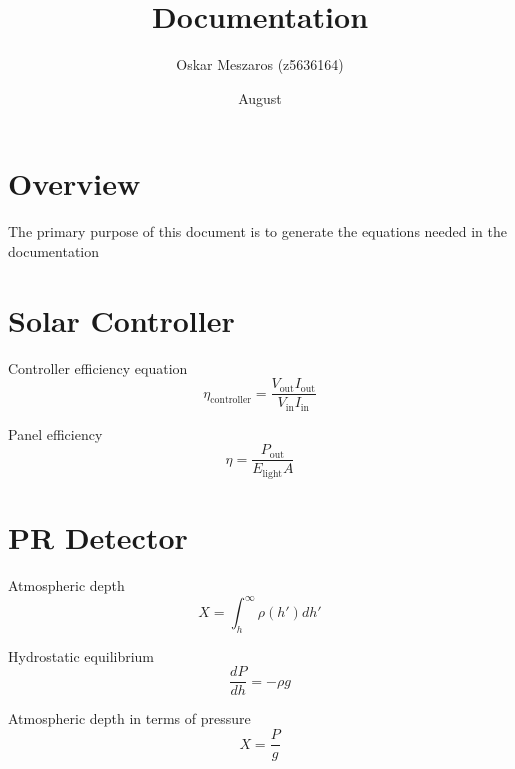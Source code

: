 \documentclass{article}
\title{Documentation}
\author{Oskar Meszaros (z5636164)}
\date{August}
\begin{document}
\maketitle
\section{Overview}
The primary purpose of this document is to generate the equations needed in the documentation

\section{Solar Controller}
Controller efficiency equation
\[
    \eta  _{\text{controller}}=\frac{V_{\text{out}}I_{\text{out}}}{V_{\text{in}}I_{\text{in}}}
\]

Panel efficiency
\[
    \eta =\frac{P_{\text{out}}}{E_{\text{light}}A}
\]

\section{PR Detector}
Atmospheric depth
\[
    X=\int_h^\infty\rho(h')dh'
\]

Hydrostatic equilibrium
\[
    \frac{d P}{d h}=-\rho g
\]

Atmospheric depth in terms of pressure
\[
    X=\frac{P}{g}
\]
\end{document}
